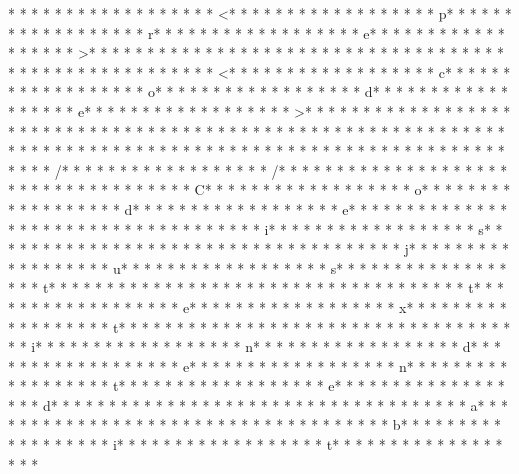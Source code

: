 * * *  * * *  * * *  *  * * *  *  * * *  * <* * *  * * *  * * *  *  * * *  *  * * *  * p* * *  * * *  * * *  *  * * *  *  * * *  * r* * *  * * *  * * *  *  * * *  *  * * *  * e* * *  * * *  * * *  *  * * *  *  * * *  * >* * *  * * *  * * *  *  * * *  *  * * *  * 
* * *  * * *  * * *  *  * * *  *  * * *  * 	* * *  * * *  * * *  *  * * *  *  * * *  * <* * *  * * *  * * *  *  * * *  *  * * *  * c* * *  * * *  * * *  *  * * *  *  * * *  * o* * *  * * *  * * *  *  * * *  *  * * *  * d* * *  * * *  * * *  *  * * *  *  * * *  * e* * *  * * *  * * *  *  * * *  *  * * *  * >* * *  * * *  * * *  *  * * *  *  * * *  * 
* * *  * * *  * * *  *  * * *  *  * * *  * 	* * *  * * *  * * *  *  * * *  *  * * *  * 
* * *  * * *  * * *  *  * * *  *  * * *  * 
* * *  * * *  * * *  *  * * *  *  * * *  * 
* * *  * * *  * * *  *  * * *  *  * * *  * /* * *  * * *  * * *  *  * * *  *  * * *  * /* * *  * * *  * * *  *  * * *  *  * * *  *  * * *  * * *  * * *  *  * * *  *  * * *  * C* * *  * * *  * * *  *  * * *  *  * * *  * o* * *  * * *  * * *  *  * * *  *  * * *  * d* * *  * * *  * * *  *  * * *  *  * * *  * e* * *  * * *  * * *  *  * * *  *  * * *  *  * * *  * * *  * * *  *  * * *  *  * * *  * i* * *  * * *  * * *  *  * * *  *  * * *  * s* * *  * * *  * * *  *  * * *  *  * * *  *  * * *  * * *  * * *  *  * * *  *  * * *  * j* * *  * * *  * * *  *  * * *  *  * * *  * u* * *  * * *  * * *  *  * * *  *  * * *  * s* * *  * * *  * * *  *  * * *  *  * * *  * t* * *  * * *  * * *  *  * * *  *  * * *  *  * * *  * * *  * * *  *  * * *  *  * * *  * t* * *  * * *  * * *  *  * * *  *  * * *  * e* * *  * * *  * * *  *  * * *  *  * * *  * x* * *  * * *  * * *  *  * * *  *  * * *  * t* * *  * * *  * * *  *  * * *  *  * * *  *  * * *  * * *  * * *  *  * * *  *  * * *  * i* * *  * * *  * * *  *  * * *  *  * * *  * n* * *  * * *  * * *  *  * * *  *  * * *  * d* * *  * * *  * * *  *  * * *  *  * * *  * e* * *  * * *  * * *  *  * * *  *  * * *  * n* * *  * * *  * * *  *  * * *  *  * * *  * t* * *  * * *  * * *  *  * * *  *  * * *  * e* * *  * * *  * * *  *  * * *  *  * * *  * d* * *  * * *  * * *  *  * * *  *  * * *  *  * * *  * * *  * * *  *  * * *  *  * * *  * a* * *  * * *  * * *  *  * * *  *  * * *  *  * * *  * * *  * * *  *  * * *  *  * * *  * b* * *  * * *  * * *  *  * * *  *  * * *  * i* * *  * * *  * * *  *  * * *  *  * * *  * t* * *  * * *  * * *  *  * * *  *  * * *  * 
